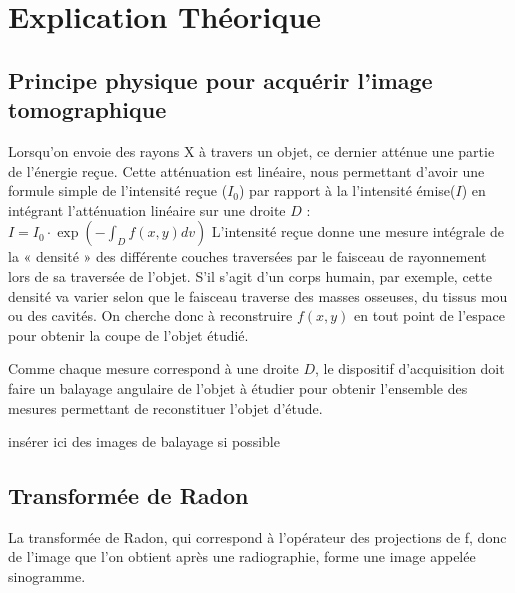 \documentclass[conference]{IEEEtran}
\begin{document}
\section{Explication Théorique}

\subsection{Principe physique pour acquérir l'image tomographique}

Lorsqu'on envoie des rayons X à travers un objet, ce dernier atténue une partie de l'énergie reçue.  Cette atténuation est linéaire, nous permettant d'avoir une formule simple de l'intensité reçue ($I_0$) par rapport à la l'intensité émise($I$) en intégrant l'atténuation linéaire sur une droite $D$ : $
I=I_0 \cdot \exp(- \int_{D} f(x,y) dv )
$
L’intensité reçue donne une mesure intégrale de la « densité » des différente couches traversées par le faisceau de rayonnement lors de sa traversée de l’objet. S’il s’agit d’un corps humain, par exemple, cette densité va varier selon que le faisceau traverse des masses osseuses, du tissus mou ou des cavités.
On cherche donc à reconstruire $f(x,y)$ en tout point de l’espace pour obtenir la coupe de l’objet étudié.

Comme chaque mesure correspond à une droite $D$, le dispositif d'acquisition doit faire un balayage angulaire de l'objet à étudier pour obtenir l'ensemble des mesures permettant de reconstituer l'objet d'étude.

insérer ici des images de balayage si possible

\subsection{Transformée de Radon}

La transformée de Radon, qui correspond à l'opérateur des projections de f, donc de l'image que l'on obtient après une radiographie, forme une image appelée sinogramme. 
\end{document}
